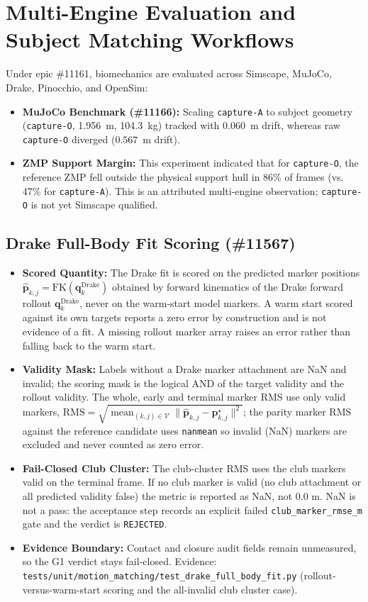 \documentclass[11pt,a4paper]{article}
\begin{document}
\section{Multi-Engine Evaluation and Subject Matching Workflows}

Under epic \#11161, biomechanics are evaluated across Simscape, MuJoCo, Drake, Pinocchio, and OpenSim:
\begin{itemize}
    \item \textbf{MuJoCo Benchmark (\#11166):} Scaling \texttt{capture-A} to subject geometry (\texttt{capture-O}, 1.956~m, 104.3~kg) tracked with $0.060$~m drift, whereas raw \texttt{capture-O} diverged ($0.567$~m drift).
    \item \textbf{ZMP Support Margin:} This experiment indicated that for \texttt{capture-O}, the reference ZMP fell outside the physical support hull in 86\% of frames (vs. 47\% for \texttt{capture-A}). This is an attributed multi-engine observation; \texttt{capture-O} is not yet Simscape qualified.
\end{itemize}

\subsection{Drake Full-Body Fit Scoring (\#11567)}
\begin{itemize}
    \item \textbf{Scored Quantity:} The Drake fit is scored on the predicted marker positions $\hat{\mathbf{p}}_{k,j}=\mathrm{FK}(\mathbf{q}^{\mathrm{Drake}}_k)$ obtained by forward kinematics of the Drake forward rollout $\mathbf{q}^{\mathrm{Drake}}_k$, never on the warm-start model markers. A warm start scored against its own targets reports a zero error by construction and is not evidence of a fit. A missing rollout marker array raises an error rather than falling back to the warm start.
    \item \textbf{Validity Mask:} Labels without a Drake marker attachment are NaN and invalid; the scoring mask is the logical AND of the target validity and the rollout validity. The whole, early and terminal marker RMS use only valid markers, $\mathrm{RMS}=\sqrt{\operatorname{mean}_{(k,j)\in\mathcal{V}}\lVert\hat{\mathbf{p}}_{k,j}-\mathbf{p}^{\star}_{k,j}\rVert^2}$; the parity marker RMS against the reference candidate uses \texttt{nanmean} so invalid (NaN) markers are excluded and never counted as zero error.
    \item \textbf{Fail-Closed Club Cluster:} The club-cluster RMS uses the club markers valid on the terminal frame. If no club marker is valid (no club attachment or all predicted validity false) the metric is reported as NaN, not $0.0$ m. NaN is not a pass: the acceptance step records an explicit failed \texttt{club\_marker\_rmse\_m} gate and the verdict is \texttt{REJECTED}.
    \item \textbf{Evidence Boundary:} Contact and closure audit fields remain unmeasured, so the G1 verdict stays fail-closed. Evidence: \texttt{tests/unit/motion\_matching/test\_drake\_full\_body\_fit.py} (rollout-versus-warm-start scoring and the all-invalid club cluster case).
\end{itemize}
\end{document}
